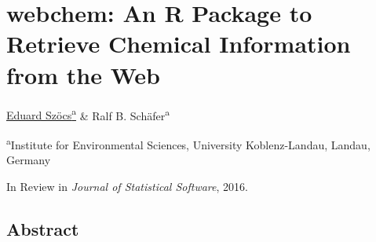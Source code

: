 \chapter[webchem: An R Package to Retrieve Chemical Information]{webchem: An R Package to Retrieve Chemical Information from the Web}
\label{sec:webchem}  

\begin{sloppypar}
\bigskip
\underline{Eduard Szöcs\textsuperscript{a}} \& Ralf B. Schäfer\textsuperscript{a}

\bigskip
\small
\noindent 
\textsuperscript{a}Institute for Environmental Sciences, University Koblenz-Landau, Landau, Germany 

\bigskip 
\normalsize
\noindent
In Review in \emph{Journal of Statistical Software}, 2016.

\end{sloppypar}
\newpage


\section{Abstract}
